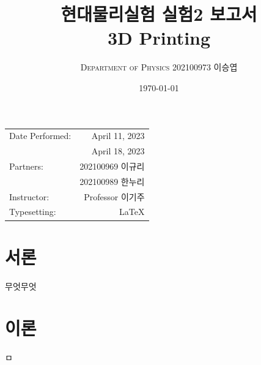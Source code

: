\documentclass[a4paper, 10pt, nanum]{CSUniSchoolLabReport}
\title{현대물리실험 실험2 보고서 \\ 3D Printing} %
\author{\textsc{Department of Physics} 202100973 이승엽}
\date{\today}
\begin{document}
\maketitle %

\begin{center}
	\begin{tabular}{l r}
		Date Performed: & April 11, 2023 \\ %
		& April 18, 2023 \\
		Partners: & 202100969 이규리 \\ %
		& 202100989 한누리 \\
		Instructor: & Professor 이기주 \\ %
		Typesetting: & LaTeX \\
	\end{tabular}
\end{center}


\maketitle


\section{서론}

	무엇무엇


\section{이론}

	ㅁ
\end{document}

